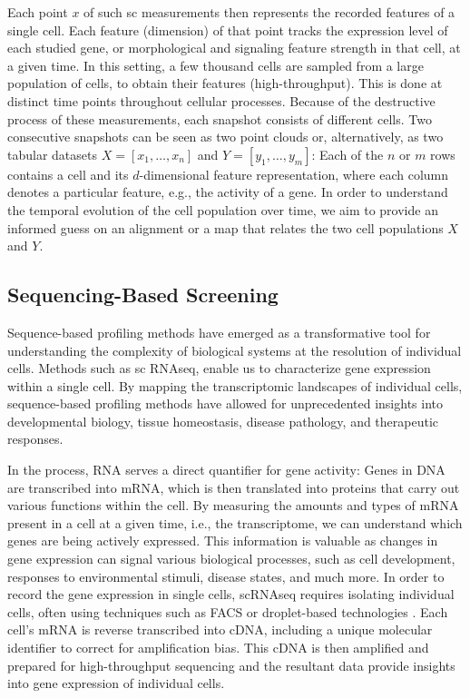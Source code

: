 Each point $x$ of such \acrlong{sc} measurements then represents the recorded features of a single cell. Each feature (dimension) of that point tracks the expression level of each studied gene, or morphological and signaling feature strength in that cell, at a given time. In this setting, a few thousand cells are sampled from a large population of cells, to obtain their features (high-throughput). This is done at distinct time points throughout cellular processes. Because of the destructive process of these measurements, each snapshot consists of different cells.
Two consecutive snapshots can be seen as two point clouds %
or, alternatively, as two tabular datasets $X = [x_1,\dots, x_n]$ and $Y=[y_1, \dots, y_m]$: Each of the $n$ or $m$ rows contains a cell and its $d$-dimensional feature representation, where each column denotes a particular feature, e.g., the activity of a gene.
In order to understand the temporal evolution of the cell population over time, we aim to provide an informed guess on an alignment or a map that relates the two cell populations $X$ and $Y$.

\subsection{Sequencing-Based Screening}
\label{sec:background_sequencing}

Sequence-based profiling methods have emerged as a transformative tool for understanding the complexity of biological systems at the resolution of individual cells. Methods such as \acrlong{sc} \acrshort{RNAseq}, enable us to characterize gene expression within a single cell.
By mapping the transcriptomic landscapes of individual cells, sequence-based profiling methods have allowed for unprecedented insights into developmental biology, tissue homeostasis, disease pathology, and therapeutic responses.

In the process, RNA serves a direct quantifier for gene activity: Genes in \acrfull{DNA} are transcribed into \acrfull{mRNA}, which is then translated into proteins that carry out various functions within the cell.
By measuring the amounts and types of \acrshort{mRNA} present in a cell at a given time, i.e., the transcriptome, we can understand which genes are being actively expressed. This information is valuable as changes in gene expression can signal various biological processes, such as cell development, responses to environmental stimuli, disease states, and much more. 
In order to record the gene expression in single cells, \acrshort{sc}\acrshort{RNAseq} requires isolating individual cells, often using techniques such as \acrfull{FACS} \citep{julius1972demonstration} or droplet-based technologies \citep{brouzes2009droplet, mazutis2013single, debs2012functional}. Each cell's \acrshort{mRNA} is reverse transcribed into \acrfull{cDNA}, including a unique molecular identifier to correct for amplification bias.
This \acrshort{cDNA} is then amplified and prepared for high-throughput sequencing and the resultant data provide insights into gene expression of individual cells.

